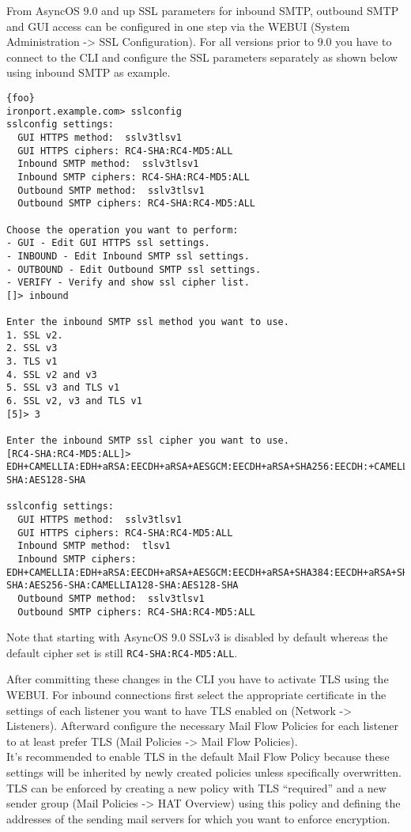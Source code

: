 From AsyncOS 9.0 and up SSL parameters for inbound SMTP, outbound SMTP and GUI access can be configured in one step via the WEBUI (System Administration -> SSL Configuration). For all versions prior to 9.0 you have to connect to the CLI and configure the SSL parameters separately as shown below using inbound SMTP as example.
\begin{lstlisting}{foo}
ironport.example.com> sslconfig
sslconfig settings:
  GUI HTTPS method:  sslv3tlsv1
  GUI HTTPS ciphers: RC4-SHA:RC4-MD5:ALL
  Inbound SMTP method:  sslv3tlsv1
  Inbound SMTP ciphers: RC4-SHA:RC4-MD5:ALL
  Outbound SMTP method:  sslv3tlsv1
  Outbound SMTP ciphers: RC4-SHA:RC4-MD5:ALL
	
Choose the operation you want to perform:
- GUI - Edit GUI HTTPS ssl settings.
- INBOUND - Edit Inbound SMTP ssl settings.
- OUTBOUND - Edit Outbound SMTP ssl settings.
- VERIFY - Verify and show ssl cipher list.
[]> inbound

Enter the inbound SMTP ssl method you want to use.
1. SSL v2.
2. SSL v3
3. TLS v1
4. SSL v2 and v3
5. SSL v3 and TLS v1
6. SSL v2, v3 and TLS v1
[5]> 3

Enter the inbound SMTP ssl cipher you want to use.
[RC4-SHA:RC4-MD5:ALL]> EDH+CAMELLIA:EDH+aRSA:EECDH+aRSA+AESGCM:EECDH+aRSA+SHA256:EECDH:+CAMELLIA128:+AES128:+SSLv3:!aNULL:!eNULL:!LOW:!3DES:!MD5:!EXP:!PSK:!DSS:!RC4:!SEED:!IDEA:!ECDSA:kEDH:CAMELLIA128-SHA:AES128-SHA

sslconfig settings:
  GUI HTTPS method:  sslv3tlsv1
  GUI HTTPS ciphers: RC4-SHA:RC4-MD5:ALL
  Inbound SMTP method:  tlsv1
  Inbound SMTP ciphers: EDH+CAMELLIA:EDH+aRSA:EECDH+aRSA+AESGCM:EECDH+aRSA+SHA384:EECDH+aRSA+SHA256:EECDH:+CAMELLIA256:+AES256:+CAMELLIA128:+AES128:+SSLv3:!aNULL:!eNULL:!LOW:!3DES:!MD5:!EXP:!PSK:!SRP:!DSS:!RC4:!SEED:!ECDSA:CAMELLIA256-SHA:AES256-SHA:CAMELLIA128-SHA:AES128-SHA
  Outbound SMTP method:  sslv3tlsv1
  Outbound SMTP ciphers: RC4-SHA:RC4-MD5:ALL
\end{lstlisting}
Note that starting with AsyncOS 9.0 SSLv3 is disabled by default whereas the default cipher set is still \texttt{RC4-SHA:RC4-MD5:ALL}. 

After committing these changes in the CLI you have to activate TLS using the WEBUI. For inbound connections first select the appropriate certificate in the settings of each listener you want to have TLS enabled on (Network -> Listeners). Afterward configure the necessary Mail Flow Policies for each listener to at least prefer TLS (Mail Policies -> Mail Flow Policies). \\
It's recommended to enable TLS in the default Mail Flow Policy because these settings will be inherited by newly created policies unless specifically overwritten.
TLS can be enforced by creating a new policy with TLS ``required'' and a new sender group (Mail Policies -> HAT Overview) using this policy and defining the addresses of the sending mail servers for which you want to enforce encryption. 

